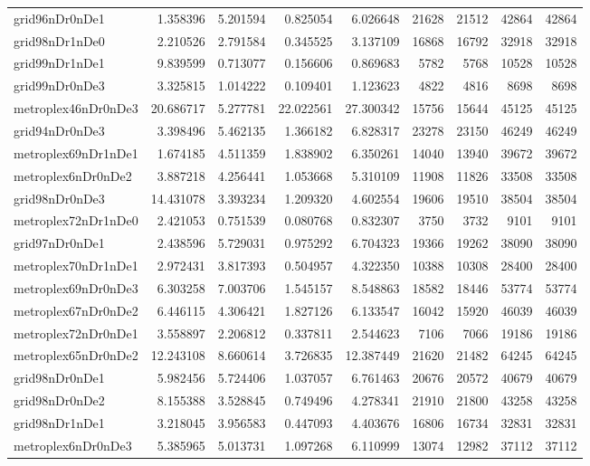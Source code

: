 \begin{longtable}{|l|r|r|r|r|r|r|r|r|}
grid96nDr0nDe1 & 1.358396 & 5.201594 & 0.825054 & 6.026648 & 21628 & 21512 & 42864 & 42864 \\
grid98nDr1nDe0 & 2.210526 & 2.791584 & 0.345525 & 3.137109 & 16868 & 16792 & 32918 & 32918 \\
grid99nDr1nDe1 & 9.839599 & 0.713077 & 0.156606 & 0.869683 & 5782 & 5768 & 10528 & 10528 \\
grid99nDr0nDe3 & 3.325815 & 1.014222 & 0.109401 & 1.123623 & 4822 & 4816 & 8698 & 8698 \\
metroplex46nDr0nDe3 & 20.686717 & 5.277781 & 22.022561 & 27.300342 & 15756 & 15644 & 45125 & 45125 \\
grid94nDr0nDe3 & 3.398496 & 5.462135 & 1.366182 & 6.828317 & 23278 & 23150 & 46249 & 46249 \\
metroplex69nDr1nDe1 & 1.674185 & 4.511359 & 1.838902 & 6.350261 & 14040 & 13940 & 39672 & 39672 \\
metroplex6nDr0nDe2 & 3.887218 & 4.256441 & 1.053668 & 5.310109 & 11908 & 11826 & 33508 & 33508 \\
grid98nDr0nDe3 & 14.431078 & 3.393234 & 1.209320 & 4.602554 & 19606 & 19510 & 38504 & 38504 \\
metroplex72nDr1nDe0 & 2.421053 & 0.751539 & 0.080768 & 0.832307 & 3750 & 3732 & 9101 & 9101 \\
grid97nDr0nDe1 & 2.438596 & 5.729031 & 0.975292 & 6.704323 & 19366 & 19262 & 38090 & 38090 \\
metroplex70nDr1nDe1 & 2.972431 & 3.817393 & 0.504957 & 4.322350 & 10388 & 10308 & 28400 & 28400 \\
metroplex69nDr0nDe3 & 6.303258 & 7.003706 & 1.545157 & 8.548863 & 18582 & 18446 & 53774 & 53774 \\
metroplex67nDr0nDe2 & 6.446115 & 4.306421 & 1.827126 & 6.133547 & 16042 & 15920 & 46039 & 46039 \\
metroplex72nDr0nDe1 & 3.558897 & 2.206812 & 0.337811 & 2.544623 & 7106 & 7066 & 19186 & 19186 \\
metroplex65nDr0nDe2 & 12.243108 & 8.660614 & 3.726835 & 12.387449 & 21620 & 21482 & 64245 & 64245 \\
grid98nDr0nDe1 & 5.982456 & 5.724406 & 1.037057 & 6.761463 & 20676 & 20572 & 40679 & 40679 \\
grid98nDr0nDe2 & 8.155388 & 3.528845 & 0.749496 & 4.278341 & 21910 & 21800 & 43258 & 43258 \\
grid98nDr1nDe1 & 3.218045 & 3.956583 & 0.447093 & 4.403676 & 16806 & 16734 & 32831 & 32831 \\
metroplex6nDr0nDe3 & 5.385965 & 5.013731 & 1.097268 & 6.110999 & 13074 & 12982 & 37112 & 37112 \\

\end{longtable}
